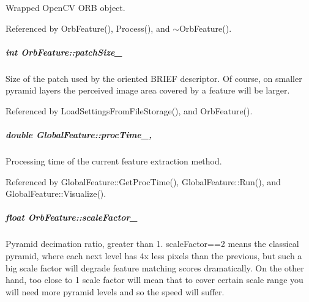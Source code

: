 Wrapped Open\-C\-V O\-R\-B object. 



Referenced by Orb\-Feature(), Process(), and $\sim$\-Orb\-Feature().

\hypertarget{group___feature_extractor_ae7f8a68d8b86f650348bc213c43f593a}{
\subparagraph[{patch\-Size\-\_\-}]{\setlength{\rightskip}{0pt plus 5cm}int Orb\-Feature\-::patch\-Size\-\_\-\hspace{0.3cm}{\ttfamily [private]}}}\label{group___feature_extractor_ae7f8a68d8b86f650348bc213c43f593a}


Size of the patch used by the oriented B\-R\-I\-E\-F descriptor. Of course, on smaller pyramid layers the perceived image area covered by a feature will be larger. 



Referenced by Load\-Settings\-From\-File\-Storage(), and Orb\-Feature().

\hypertarget{group___feature_extractor_aa3306975b929f5503dac51829f9e04a0}{
\subparagraph[{proc\-Time\-\_\-}]{\setlength{\rightskip}{0pt plus 5cm}double Global\-Feature\-::proc\-Time\-\_\-\hspace{0.3cm}{\ttfamily [protected]}, {\ttfamily [inherited]}}}\label{group___feature_extractor_aa3306975b929f5503dac51829f9e04a0}


Processing time of the current feature extraction method. 



Referenced by Global\-Feature\-::\-Get\-Proc\-Time(), Global\-Feature\-::\-Run(), and Global\-Feature\-::\-Visualize().

\hypertarget{group___feature_extractor_a8cbd44d79e8952dd7b51be32d1eaddee}{
\subparagraph[{scale\-Factor\-\_\-}]{\setlength{\rightskip}{0pt plus 5cm}float Orb\-Feature\-::scale\-Factor\-\_\-\hspace{0.3cm}{\ttfamily [private]}}}\label{group___feature_extractor_a8cbd44d79e8952dd7b51be32d1eaddee}


Pyramid decimation ratio, greater than 1. scale\-Factor==2 means the classical pyramid, where each next level has 4x less pixels than the previous, but such a big scale factor will degrade feature matching scores dramatically. On the other hand, too close to 1 scale factor will mean that to cover certain scale range you will need more pyramid levels and so the speed will suffer. 




